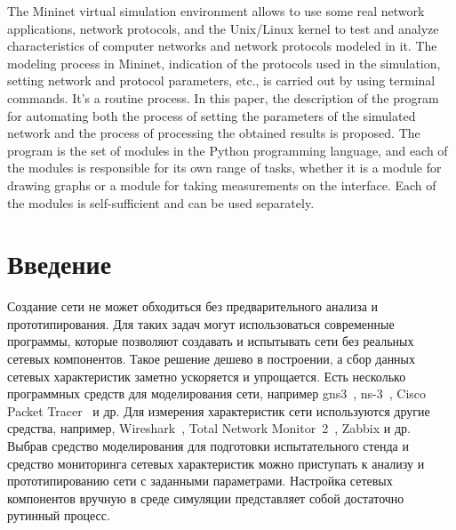 \documentclass[60x84/16,8pt]{ittmm}
\begin{document}
\begin{altabstract}
  The Mininet virtual simulation environment allows to use some real
  network applications, network protocols, and the Unix/Linux kernel
  to test and analyze characteristics of computer networks and network
  protocols modeled in it. The modeling process in Mininet, indication
  of the protocols used in the simulation, setting network and
  protocol parameters, etc., is carried out by using terminal
  commands. It’s a routine process.  In this paper, the description of
  the program for automating both the process of setting the
  parameters of the simulated network and the process of processing
  the obtained results is proposed.  The program is the set of modules
  in the Python programming language, and each of the modules is
  responsible for its own range of tasks, whether it is a module for
  drawing graphs or a module for taking measurements on the
  interface. Each of the modules is self-sufficient and can be used
  separately.
\end{altabstract}


\maketitle

\section{Введение}
\label{sec:intro}

Создание сети не может обходиться без предварительного анализа и
прототипирования. Для таких задач могут использоваться современные
программы, которые позволяют создавать и испытывать сети без реальных
сетевых компонентов. Такое решение дешево в построении, а сбор данных
сетевых характеристик заметно ускоряется и упрощается. Есть несколько
программных средств для моделирования сети, например gns3~\cite{gns3},
ns-3~\cite{ns3}, Cisco Packet Tracer~\cite{cpt} и др. Для измерения
характеристик сети используются другие средства, например,
Wireshark~\cite{wireshark}, Total Network Monitor~2~\cite{tnm2},
Zabbix \cite{zabbix} и др. Выбрав средство моделирования для
подготовки испытательного стенда и средство мониторинга сетевых
характеристик можно приступать к анализу и прототипированию сети с
заданными параметрами.  Настройка сетевых компонентов вручную в среде
симуляции представляет собой достаточно рутинный процесс.
\end{document}
